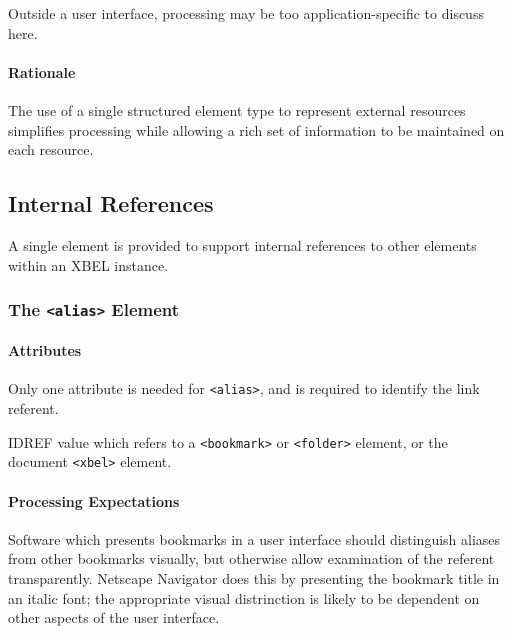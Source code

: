 \documentclass{howto}
\newcommand{\element}[1]{\texttt{<#1>}}
\newcommand{\attribute}[1]{\texttt{#1}}
\begin{document}
        Outside a user interface, processing may be too
        application-specific to discuss here.

      \paragraph*{Rationale}
        The use of a single structured element type to represent
        external resources simplifies processing while allowing a rich 
        set of information to be maintained on each resource.

  \subsection{Internal References
              \label{internal-references}}

    A single element is provided to support internal references to
    other elements within an XBEL instance.

    \subsubsection{The \element{alias} Element
                   \label{element-alias}}

      \paragraph*{Attributes}
        Only one attribute is needed for \element{alias}, and is
        required to identify the link referent.

        \begin{definitions}
          \term{\attribute{ref}, \emph{required}}
          IDREF value which refers to a \element{bookmark} or
          \element{folder} element, or the document \element{xbel}
          element.
	\end{definitions}

      \paragraph*{Processing Expectations}
        Software which presents bookmarks in a user interface should
        distinguish aliases from other bookmarks visually, but
        otherwise allow examination of the referent transparently.
        Netscape Navigator does this by presenting the bookmark title
        in an italic font; the appropriate visual distrinction is
        likely to be dependent on other aspects of the user
        interface.
\end{document}
